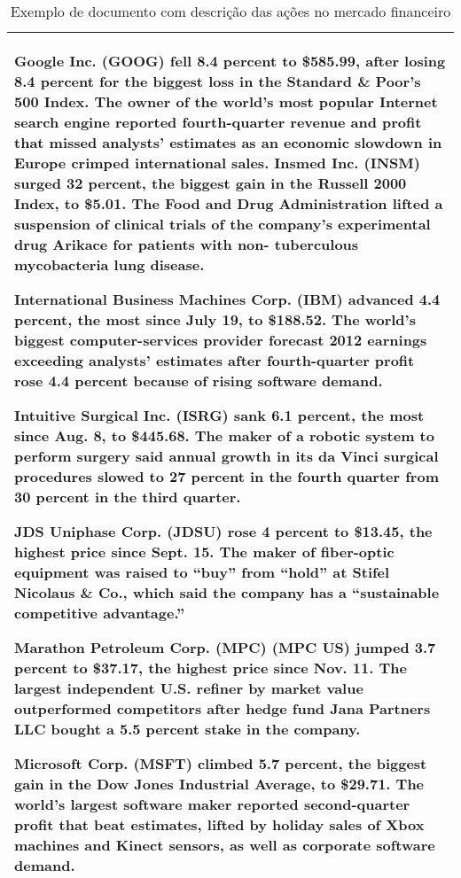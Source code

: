 \documentclass[a4paper,12pt]{article}
\begin{document}
\begin{table}[h!]
\begin{tabular}{|l|}
\hline
\begin{minipage}[t]{1.0\columnwidth}

Google Inc. (GOOG) fell 8.4 percent to \$585.99, after losing 8.4 percent for the biggest loss in the Standard \& Poor’s 500 Index. The owner of the world’s most popular Internet search engine reported fourth-quarter revenue and profit that missed analysts’ estimates as an economic slowdown in Europe crimped international sales.
Insmed Inc. (INSM) surged 32 percent, the biggest gain in the Russell 2000 Index, to \$5.01. The Food and Drug Administration lifted a suspension of clinical trials of the company’s experimental drug Arikace for patients with non- tuberculous mycobacteria lung disease.

International Business Machines Corp. (IBM) advanced 4.4 percent, the most since July 19, to \$188.52. The world’s biggest computer-services provider forecast 2012 earnings exceeding analysts’ estimates after fourth-quarter profit rose 4.4 percent because of rising software demand.

Intuitive Surgical Inc. (ISRG) sank 6.1 percent, the most since Aug. 8, to \$445.68. The maker of a robotic system to perform surgery said annual growth in its da Vinci surgical procedures slowed to 27 percent in the fourth quarter from 30 percent in the third quarter.

JDS Uniphase Corp. (JDSU) rose 4 percent to \$13.45, the highest price since Sept. 15. The maker of fiber-optic equipment was raised to “buy” from “hold” at Stifel Nicolaus \& Co., which said the company has a “sustainable competitive advantage.”

Marathon Petroleum Corp. (MPC) (MPC US) jumped 3.7 percent to \$37.17, the highest price since Nov. 11. The largest independent U.S. refiner by market value outperformed competitors after hedge fund Jana Partners LLC bought a 5.5 percent stake in the company.

Microsoft Corp. (MSFT) climbed 5.7 percent, the biggest gain in the Dow Jones Industrial Average, to \$29.71. The world’s largest software maker reported second-quarter profit that beat estimates, lifted by holiday sales of Xbox machines and Kinect sensors, as well as corporate software demand.

\end{minipage}\tabularnewline
\hline
\end{tabular}
\caption{Exemplo de documento com descrição das ações no mercado financeiro}
\label{tab:exemplo3}
\end{table}
\end{document}
